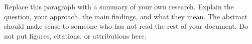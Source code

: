 Replace this paragraph with a summary of your own research. Explain the question,
your approach, the main findings, and what they mean. The abstract should make
sense to someone who has not read the rest of your document. Do not put figures,
citations, or attributions here.
